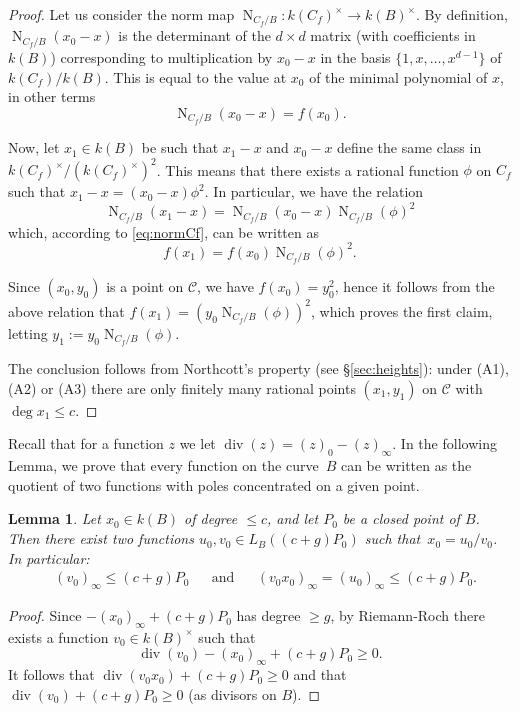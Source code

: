 \documentclass[11pt]{article}
\theoremstyle{plain}
\newtheorem{lemma}[theorem]{Lemma}
\theoremstyle{definition}
\DeclareMathOperator{\divisor}{div}
\DeclareMathOperator{\Norm}{N}
\begin{document}
\begin{proof}
Let us consider the norm map $\Norm_{C_f/B}:k(C_f)^\times\to k(B)^\times$. By definition, $\Norm_{C_f/B}(x_0-x)$ is the determinant of the $d\times d$ matrix (with coefficients in $k(B)$) corresponding to multiplication by $x_0-x$ in the basis $\{1,x,\dots,x^{d-1}\}$ of $k(C_f)/k(B)$. This is equal to the value at $x_0$ of the minimal polynomial of $x$, in other terms
\begin{equation}
\label{eq:normCf}
\Norm_{C_f/B}(x_0-x) = f(x_0).
\end{equation}

Now, let $x_1\in k(B)$ be such that $x_1-x$ and $x_0-x$ define the same class in $k(C_f)^\times/(k(C_f)^\times)^2$. This means that there exists a rational function $\phi$ on $C_f$ such that $x_1-x = (x_0-x)\phi^2$. In particular, we have the relation
$$
\Norm_{C_f/B}(x_1-x) = \Norm_{C_f/B}(x_0-x)\Norm_{C_f/B}(\phi)^2
$$
which, according to \eqref{eq:normCf}, can be written as
$$
f(x_1)=f(x_0)\Norm_{C_f/B}(\phi)^2.
$$

Since $(x_0,y_0)$ is a point on $\mathcal{C}$, we have $f(x_0)=y_0^2$, hence it follows from the above relation that $f(x_1)=(y_0\Norm_{C_f/B}(\phi))^2$, which proves the first claim, letting $y_1:=y_0\Norm_{C_f/B}(\phi)$.

The conclusion follows from Northcott's property (see \S{}\ref{sec:heights}): under (A1), (A2) or (A3) there are only finitely many rational points $(x_1,y_1)$ on $\mathcal{C}$ with $\deg x_1 \leq c$.
\end{proof}


Recall that for a function $z$ we let $\divisor(z)= (z)_0 - (z)_\infty$.
In the following Lemma, we prove that every function on the curve~$B$ can be written as the quotient of two functions with poles concentrated on a given
point.

\begin{lemma}
\label{lem:x0denominator}
Let $x_0\in k(B)$ of degree $\leq c$, and let $P_0$ be a closed point of $B$. %
Then there exist two functions $u_0, v_0 \in L_B((c+g)P_0)$ such that~$x_0=u_0/v_0$. In particular:
\begin{align*}
& (v_0)_\infty \leq (c+g)P_0
&
&\text{and}
&
& (v_0x_0)_\infty = (u_0)_\infty \leq (c+g)P_0.
\end{align*}
\end{lemma}

\begin{proof}
Since $-(x_0)_\infty +(c+g)P_0$ has degree $\geq g$, by Riemann-Roch there exists a function $v_0 \in k(B)^\times$ such that
$$
\divisor(v_0) - (x_0)_\infty +(c+g)P_0 \geq 0.
$$
It follows that $\divisor(v_0x_0) +(c+g)P_0 \geq 0$ and that $\divisor(v_0) +(c+g)P_0 \geq 0$ (as divisors on $B$).
\end{proof}
\end{document}
